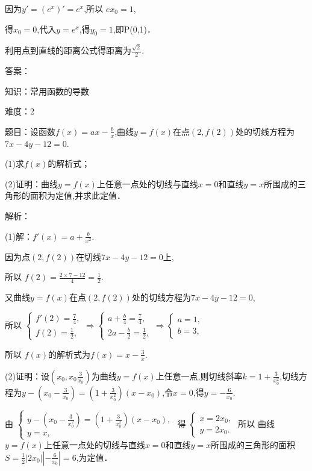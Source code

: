 \documentclass{article} %
\begin{document}
因为$y'=(e^{x})'=e^{x}$,所以 $ex_{0}=1$,

得$x_{0}=0$,代入$y=e^{x}$,得$y_{0}=1$,即P(0,1)．

利用点到直线的距离公式得距离为$\frac{\sqrt{2}}{2}$.

答案：



知识：常用函数的导数

难度：2

题目：设函数$f(x)=ax-\frac{b}{x}$,曲线$y=f(x)$在点$(2,f(2))$处的切线方程为$7x-4y-12=0$.

(1)求$f(x)$的解析式；

(2)证明：曲线$y=f(x)$上任意一点处的切线与直线$x=0$和直线$y=x$所围成的三角形的面积为定值,并求此定值．

解析：

(1)解：$f'(x)=a+\frac{b}{x^2}$.

因为点$(2,f(2))$在切线$7x-4y-12=0$上,

所以 $f(2)=\frac{2\times7-12}{4}=\frac{1}{2}$.

又曲线$y=f(x)$在点$(2,f(2))$处的切线方程为$7x-4y-12=0$,

所以 $
\begin{cases}
f'(2)=\frac{7}{4},\\
f(2)=\frac{1}{2},
\end{cases}
\Rightarrow 
\begin{cases}
a+\frac{b}{4}=\frac{7}{4},\\
2a-\frac{b}{2}=\frac{1}{2},
\end{cases}
\Rightarrow 
\begin{cases}
a=1,\\
b=3,
\end{cases}
$

所以 $f(x)$的解析式为$f(x)=x-\frac{3}{x}$.

(2)证明：设$(x_0,x_0\frac{3}{x_0})$为曲线$y=f(x)$上任意一点,则切线斜率$k=1+\frac{3}{x_0^2}$,切线方程为$y-(x_0-\frac{3}{x_0})=(1+\frac{3}{x_0^2})(x-x_{0})$,令$x=0$,得$y=-\frac{6}{x_0}$.

由
$
\begin{cases}
y-(x_0-\frac{3}{x_0^2})=(1+\frac{3}{x_0^2})(x-x_0),\\
y=x,
\end{cases}$
得
$
\begin{cases}
x=2x_0,\\
y=2x_0.
\end{cases}$
所以 曲线$y=f(x)$上任意一点处的切线与直线$x=0$和直线$y=x$所围成的三角形的面积$S=\frac{1}{2}|2x_{0}||-\frac{6}{x_0}|=6$,为定值．
\end{document}
